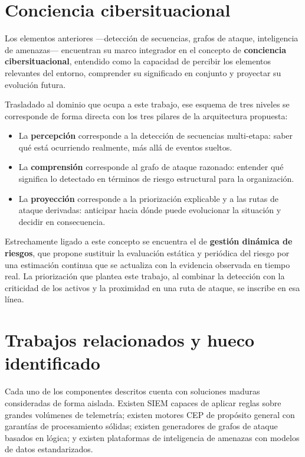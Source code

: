 \section{Conciencia cibersituacional}
\label{sec:conciencia}

Los elementos anteriores —detección de secuencias, grafos de ataque, inteligencia de
amenazas— encuentran su marco integrador en el concepto de \textbf{conciencia
cibersituacional}, entendido como la capacidad de percibir los elementos relevantes del
entorno, comprender su significado en conjunto y proyectar su evolución futura.

Trasladado al dominio que ocupa a este trabajo, ese esquema de tres niveles se corresponde
de forma directa con los tres pilares de la arquitectura propuesta:

\begin{itemize}
    \item La \textbf{percepción} corresponde a la detección de secuencias multi-etapa: saber
    qué está ocurriendo realmente, más allá de eventos sueltos.
    \item La \textbf{comprensión} corresponde al grafo de ataque razonado: entender qué
    significa lo detectado en términos de riesgo estructural para la organización.
    \item La \textbf{proyección} corresponde a la priorización explicable y a las rutas de
    ataque derivadas: anticipar hacia dónde puede evolucionar la situación y decidir en
    consecuencia.
\end{itemize}

Estrechamente ligado a este concepto se encuentra el de \textbf{gestión dinámica de
riesgos}, que propone sustituir la evaluación estática y periódica del riesgo por una
estimación continua que se actualiza con la evidencia observada en tiempo real. La
priorización que plantea este trabajo, al combinar la detección con la criticidad de los
activos y la proximidad en una ruta de ataque, se inscribe en esa línea.

\section{Trabajos relacionados y hueco identificado}
\label{sec:relacionados}

Cada uno de los componentes descritos cuenta con soluciones maduras consideradas de forma
aislada. Existen SIEM capaces de aplicar reglas sobre grandes volúmenes de telemetría;
existen motores CEP de propósito general con garantías de procesamiento sólidas; existen
generadores de grafos de ataque basados en lógica; y existen plataformas de inteligencia de
amenazas con modelos de datos estandarizados.

